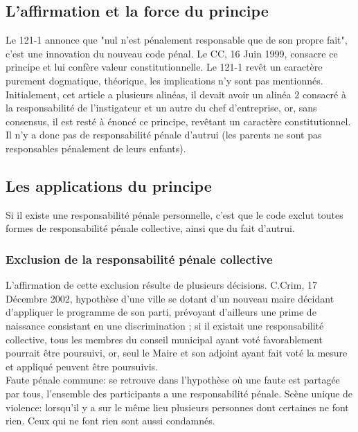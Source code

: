 \documentclass[10pt, a4paper, openany]{book}
\begin{document}
\subsection{L'affirmation et la force du principe}

Le 121-1 annonce que "nul n'est pénalement responsable que de son propre fait", c'est une innovation du nouveau code pénal. Le CC, 16 Juin 1999, consacre ce principe et lui confère valeur constitutionnelle. Le 121-1 revêt un caractère purement dogmatique, théorique, les implications n'y sont pas mentionnés. Initialement, cet article a plusieurs alinéas, il devait avoir un alinéa 2 consacré à la responsabilité de l'instigateur et un autre du chef d'entreprise, or, sans consensus, il est resté à énoncé ce principe, revêtant un caractère constitutionnel. \\
Il n'y a donc pas de responsabilité pénale d'autrui (les parents ne sont pas responsables pénalement de leurs enfants). 

\subsection{Les applications du principe}

Si il existe une responsabilité pénale personnelle, c'est que le code exclut toutes formes de responsabilité pénale collective, ainsi que du fait d'autrui. 

\subsubsection{Exclusion de la responsabilité pénale collective}

L'affirmation de cette exclusion résulte de plusieurs décisions. C.Crim, 17 Décembre 2002, hypothèse d'une ville se dotant d'un nouveau maire décidant d'appliquer le programme de son parti, prévoyant d'ailleurs une prime de naissance consistant en une discrimination ; si il existait une responsabilité collective, tous les membres du conseil municipal ayant voté favorablement pourrait être poursuivi, or, seul le Maire et son adjoint ayant fait voté la mesure et appliqué peuvent être poursuivis. \\
Faute pénale commune: se retrouve dans l'hypothèse où une faute est partagée par tous, l'ensemble des participants a une responsabilité pénale. Scène unique de violence: lorsqu'il y a sur le même lieu plusieurs personnes dont certaines ne font rien. Ceux qui ne font rien sont aussi condamnés. 
\end{document}
